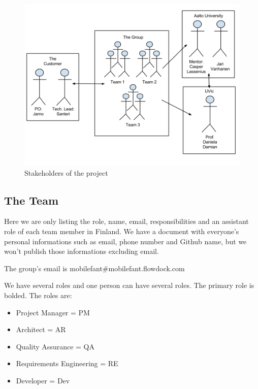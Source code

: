 \begin{figure}[H]
\centering
\includegraphics[width=1\textwidth]{imgs/stakeholders.png}
\caption{Stakeholders of the project}
\label{fig:stakeholders}
\end{figure}

\subsection{The Team}

Here we are only listing the role, name, email, responsibilities and an 
assistant role of each team member in Finland. We have a document with everyone's personal informations such as email, phone number and Github name, but we won't publish those informations excluding email.

The group's email is mobilefant\#mobilefant.flowdock.com

We have several roles and one person can have several roles. The primary role is bolded. The roles are:

\begin{itemize}
\item Project Manager = PM
\item Architect = AR
\item Quality Assurance = QA
\item Requirements Engineering = RE
\item Developer = Dev
\end{itemize}

